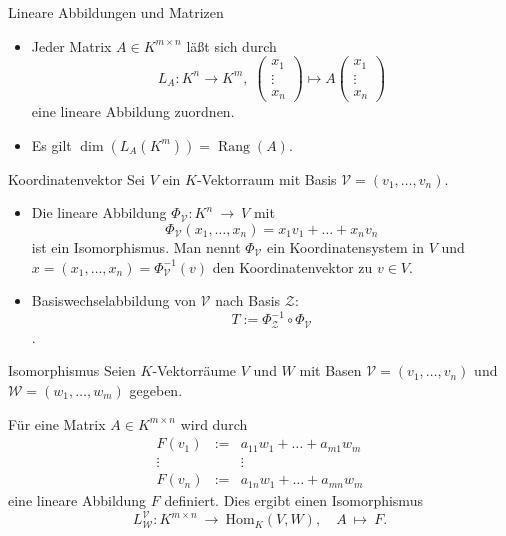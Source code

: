 \documentclass[hyperref={xetex}]{beamer}
\begin{document}
\begin{frame}{Lineare Abbildungen und Matrizen}
\begin{itemize}
\item Jeder Matrix $A \in K^{m \times n}$ läßt sich durch 
\[
 L_A: K^n \rightarrow K^m,\; 
\begin{pmatrix}
 x_1\\
\vdots\\
x_n
\end{pmatrix}
\longmapsto
A
\begin{pmatrix}
 x_1\\
\vdots\\
x_n
\end{pmatrix}
\]
eine lineare Abbildung zuordnen.
\item Es gilt $\operatorname{dim}(L_A(K^m))=\operatorname{Rang}(A)$.
\end{itemize}
\end{frame}

\begin{frame}{Koordinatenvektor}
Sei $V$ ein $K$-Vektorraum mit Basis $\mathcal{V}=(v_1, \dots
,v_n)$.
\begin{itemize}
\item Die lineare Abbildung 
$\Phi_\mathcal{V}:K^n \ \rightarrow \ V$ mit
\[\Phi_\mathcal{V}(x_1,\dots ,x_n)=x_1v_1+ \dots +x_nv_n\]
ist ein Isomorphismus. Man nennt $\Phi_\mathcal{V}$ ein
{\color{red} Koordinatensystem} in $V$ und $x=(x_1,\dots ,x_n)=\Phi_\mathcal{V}^{-1}(v)$
den {\color{red} Koordinatenvektor} zu $v \in V$.
\item Basiswechselabbildung von $\mathcal{V}$ nach Basis $\mathcal{Z}$:
\[T:= \Phi_\mathcal{Z}^{-1} \circ \Phi_\mathcal{V}\].
 \end{itemize}
\end{frame}

\begin{frame}[fragile]{Isomorphismus}
Seien $K$-Vektorräume $V$ und $W$ mit Basen $\mathcal{V}=(v_1, \dots
,v_n)$ und $\mathcal{W}=(w_1, \dots ,w_m)$ gegeben. 

 Für eine Matrix $A\in K^{m
 \times n}$ wird durch
\begin{eqnarray*}
F(v_1) & := & a_{11}w_1 + \dots +a_{m1} w_m\\
\vdots &    & \vdots     \\
F(v_n) & := & a_{1n} w_1 + \dots + a_{mn}w_m
\end{eqnarray*}
eine lineare Abbildung $F$ definiert. Dies ergibt einen Isomorphismus
\[
L^\mathcal{V}_\mathcal{W}: K^{m \times n} \ \rightarrow \
\mathrm{Hom}_K(V,W), \quad A \ \mapsto \ F.
\] 
\end{frame}
\end{document}
